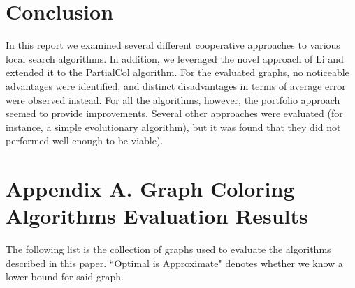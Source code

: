 \documentclass[runningheads]{llncs}
\begin{document}
\section{Conclusion}
In this report we examined several different cooperative approaches to various local search algorithms. In addition, we leveraged the novel approach of Li and extended it to the PartialCol algorithm. For the evaluated graphs, no noticeable advantages were identified, and distinct disadvantages in terms of average error were observed instead. For all the algorithms, however, the portfolio approach seemed to provide improvements. Several other approaches were evaluated (for instance, a simple evolutionary algorithm), but it was found that they did not performed well enough to be viable).


\section{Appendix A. Graph Coloring Algorithms Evaluation Results}

The following list is the collection of graphs used to evaluate the algorithms described in this paper. ``Optimal is Approximate" denotes whether we know a lower bound for said graph.
\end{document}
